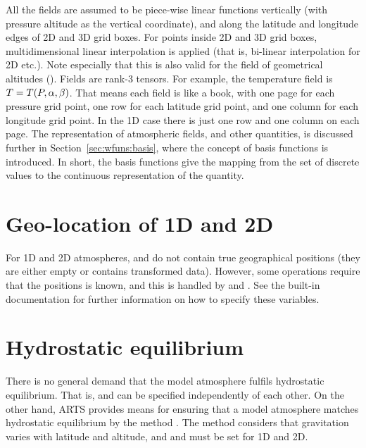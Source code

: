 All the fields are assumed to be piece-wise linear functions vertically (with
pressure altitude as the vertical coordinate), and along the latitude and
longitude edges of 2D and 3D grid boxes. For points inside 2D and 3D grid
boxes, multidimensional linear interpolation is applied (that is, bi-linear
interpolation for 2D etc.). Note especially that this is also valid for the
field of geometrical altitudes (). Fields are rank-3
tensors. For example, the temperature field is $T=T(P,\alpha,\beta)$. That
means each field is like a book, with one page for each pressure grid point,
one row for each latitude grid point, and one column for each longitude grid
point. In the 1D case there is just one row and one column on each page. The
representation of atmospheric fields, and other quantities, is discussed
further in Section~\ref{sec:wfuns:basis}, where the concept of basis
functions is introduced. In short, the basis functions
give the mapping from the set of discrete values to the continuous
representation of the quantity.



\section{Geo-location of 1D and 2D}
\label{sec:fm_defs:geoloc}

For 1D and 2D atmospheres,  and  do
not contain true geographical positions (they are either empty or
 contains transformed data). However, some operations
require that the positions is known, and this  is handled
by  and . See the built-in
documentation for further information on how to specify these variables.



\section{Hydrostatic equilibrium}
\label{sec:fm_defs:hse}

There is no general demand that the model atmosphere fulfils hydrostatic
equilibrium. That is,  and  can be
specified independently of each other. On the other hand, ARTS provides means
for ensuring that a model atmosphere matches hydrostatic equilibrium by the
method . The method considers that gravitation varies
with latitude and altitude, and  and
 must be set for 1D and 2D.

